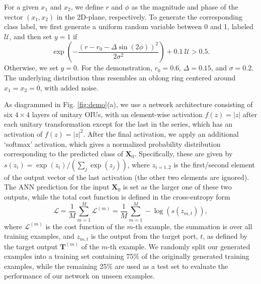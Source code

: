 For a given $x_1$ and $x_2$, we define $r$ and $\phi$ as the magnitude and phase of the vector $(x_1, x_2)$ in the 2D-plane, respectively. To generate the corresponding class label, we first generate a uniform random variable between 0 and 1, labeled $\mathcal{U}$, and then set $y=1$ if
\begin{equation}
\exp{\left(-\frac{(r-r_0-\Delta \sin(2\phi))^2}{2\sigma^2}\right)} + 0.1~\mathcal{U} > 0.5.
\end{equation}
Otherwise, we set $y=0$.  For the demonstration, $r_0 = 0.6$, $\Delta = 0.15$, and $\sigma = 0.2$. The underlying distribution thus resembles an oblong ring centered around $x_1 = x_2 = 0$, with added noise. 

As diagrammed in Fig. \ref{fig:demo}(a), we use a network architecture consisting of six $4 \times 4$ layers of unitary OIUs, with an element-wise activation $f(z) = |z|$ after each unitary transformation except for the last in the series, which has an activation of $f(z) = |z|^2$. After the final activation, we apply an additional `softmax' activation, which gives a normalized probability distribution corresponding to the predicted class of $\mathbf{X}_0$. Specifically, these are given by $s(z_i) = \exp{(z_i)}/\left( \sum_j \exp{(z_j)} \right)$, where $z_{i = 1, 2}$ is the first/second element of the output vector of the last activation (the other two elements are ignored). The ANN prediction for the input $\mathbf{X}_0$ is set as the larger one of these two outputs, while the total cost function is defined in the cross-entropy form
%
\begin{equation}
\mathcal{\mathcal{L}} = \frac{1}{M}\sum_{m=1}^M \mathcal{L}^{(m)} = \frac{1}{M}\sum_{m=1}^M -\log(s(z_{m, t})),
\label{eq:cross_entropy}
\end{equation}
%
where $\mathcal{L}^{(m)}$ is the cost function of the $m$-th example, the summation is over all training examples, and $z_{m, t}$ is the output from the target port, $t$, as defined by the target output $\mathbf{T}^{(m)}$ of the $m$-th example. We randomly split our generated examples into a training set containing 75\% of the originally generated training examples, while the remaining 25\% are used as a test set to evaluate the performance of our network on unseen examples.

